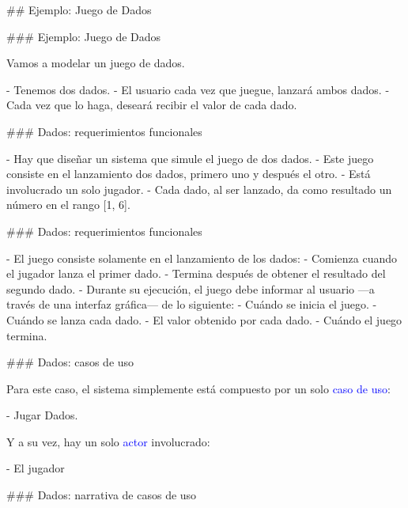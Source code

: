 ## Ejemplo: Juego de Dados

### Ejemplo: Juego de Dados


Vamos a modelar un juego de dados.\newline

- Tenemos dos dados.
- El usuario cada vez que juegue, lanzará ambos dados.
- Cada vez que lo haga, deseará recibir el valor de cada dado.

### Dados: requerimientos funcionales

\label{dados:clases}

- Hay que diseñar un \alert{sistema} que simule el \alert{juego de dos dados}.
    - Este juego consiste en el \alert{lanzamiento} dos \alert{dados}, primero uno y después el otro.
- Está involucrado un solo \alert{jugador}.
- Cada dado, al ser lanzado, da como \alert{resultado} un número en el rango [1, 6].

### Dados: requerimientos funcionales


- El juego consiste solamente en el lanzamiento de los dados:
    - Comienza cuando el jugador lanza el \alert{primer dado}.
    - Termina después de obtener el resultado del \alert{segundo dado}.
- Durante su ejecución, el juego debe informar al \alert{usuario} ---a través de una \alert{interfaz gráfica}--- de lo siguiente:
    - Cuándo se inicia el juego.
    - Cuándo se lanza cada dado.
    - El valor obtenido por cada dado.
    - Cuándo el juego termina.

### Dados: casos de uso


Para este caso, el sistema simplemente está compuesto por un solo \textcolor{blue}{caso de uso}:

- Jugar Dados.

Y a su vez, hay un solo \textcolor{blue}{actor} involucrado:

- El jugador


\exUseCaseDices



### Dados: narrativa de casos de uso



